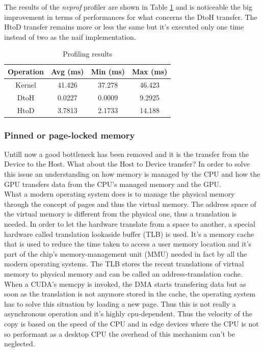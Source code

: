 \documentclass[paper=a4, fontsize=10pt]{scrartcl}	%
\begin{document}
	The results of the \textit{nvprof} profiler are shown in Table \ref{tab:nvprof_naif2} and is noticeable the big improvement in terms of performances for what concerns the DtoH transfer. The HtoD transfer remains more or less the same but it's executed only one time instead of two as the naif implementation.

	\begin{table}[H]
		\centering
		\begin{tabular}{||c | c c c||} 
			\hline
			Operation & Avg (ms) & Min (ms) & Max (ms) \\ [0.5ex] 
			\hline\hline
			Kernel & 41.426 & 37.278 & 46.423 \\ 
			\hdashline
			DtoH & 0.0227 & 0.0009 & 9.2925 \\
			\hdashline
			HtoD & 3.7813 & 2.1733 & 14.188 \\
			\hline
		\end{tabular}
		\caption{Profiling results}
		\label{tab:nvprof_naif2}
	\end{table}

	\subsubsection{Pinned or page-locked memory}

	Untill now a good bottleneck has been removed and it is the transfer from the Device to the Host. What about the Host to Device transfer? In order to solve this issue an understanding on how memory is managed by the CPU and how the GPU transfers data from the CPU's managed memory and the GPU.\\

	What a modern operating system does is to manage the physical memory through the concept of pages and thus the virtual memory. The address space of the virtual memory is different from the physical one, thus a translation is needed. In order to let the hardware translate from a space to another, a special hardware called translation lookaside buffer (TLB) is used. It's a memory cache that is used to reduce the time taken to access a user memory location and it's part of the chip's memory-management unit (MMU) needed in fact by all the modern operating systems. The TLB stores the recent translations of virtual memory to physical memory and can be called an address-translation cache.\\

	When a CUDA's memcpy is invoked, the DMA starts transfering data but as soon as the translation is not anymore stored in the cache, the operating system has to solve this situation by loading a new page. Thus this is not really a asynchronous operation and it's highly cpu-dependent. Thus the velocity of the copy is based on the speed of the CPU and in edge devices where the CPU is not so performant as a desktop CPU the overhead of this mechanism can't be neglected.\\
	
\end{document}
